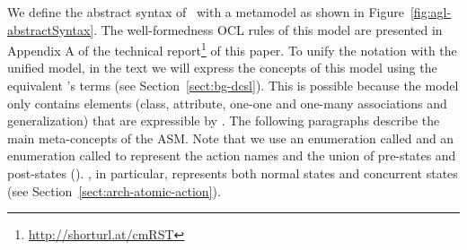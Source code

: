 
We define the abstract syntax of \agl~with a metamodel as shown in Figure~\ref{fig:agl-abstractSyntax}. The well-formedness OCL rules of this model are presented in Appendix A of the technical report\footnote{\url{http://shorturl.at/cmRST}} of this paper. %
To unify the notation with the unified model, in the text we will express the concepts of this model using the equivalent \dcsl's terms (see Section~\ref{sect:bg-dcsl}). This is possible because the model only contains elements (class, attribute, one-one and one-many associations and generalization) that are expressible by \dcsl.
%
The following paragraphs describe the main meta-concepts of the ASM. Note that we use an enumeration called  and an enumeration called  to represent the action names and the union of pre-states and post-states (\resp). , in particular, represents both normal states and concurrent states (see Section~\ref{sect:arch-atomic-action}).
%

